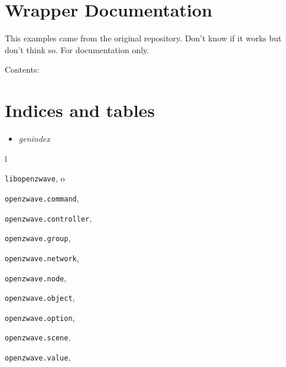\documentclass[letterpaper,10pt,english]{sphinxmanual}
\begin{document}
\chapter{Wrapper Documentation}
\label{wrapper:wrapper-documentation}\label{wrapper::doc}
This examples came from the original repository. Don't know if it works
but don't think so. For documentation only.

Contents:


\chapter{Indices and tables}
\label{index:indices-and-tables}\begin{itemize}
\item {} 
\emph{genindex}

\end{itemize}


\renewcommand{\indexname}{Python Module Index}
\begin{theindex}
\def\bigletter#1{{\Large\sffamily#1}\nopagebreak\vspace{1mm}}
\bigletter{l}
\item {\texttt{libopenzwave}}, \pageref{libopenzwave:module-libopenzwave}
\indexspace
\bigletter{o}
\item {\texttt{openzwave.command}}, \pageref{command:module-openzwave.command}
\item {\texttt{openzwave.controller}}, \pageref{controller:module-openzwave.controller}
\item {\texttt{openzwave.group}}, \pageref{group:module-openzwave.group}
\item {\texttt{openzwave.network}}, \pageref{network:module-openzwave.network}
\item {\texttt{openzwave.node}}, \pageref{node:module-openzwave.node}
\item {\texttt{openzwave.object}}, \pageref{object:module-openzwave.object}
\item {\texttt{openzwave.option}}, \pageref{option:module-openzwave.option}
\item {\texttt{openzwave.scene}}, \pageref{scene:module-openzwave.scene}
\item {\texttt{openzwave.value}}, \pageref{value:module-openzwave.value}
\end{theindex}

\renewcommand{\indexname}{Index}
\printindex
\end{document}
